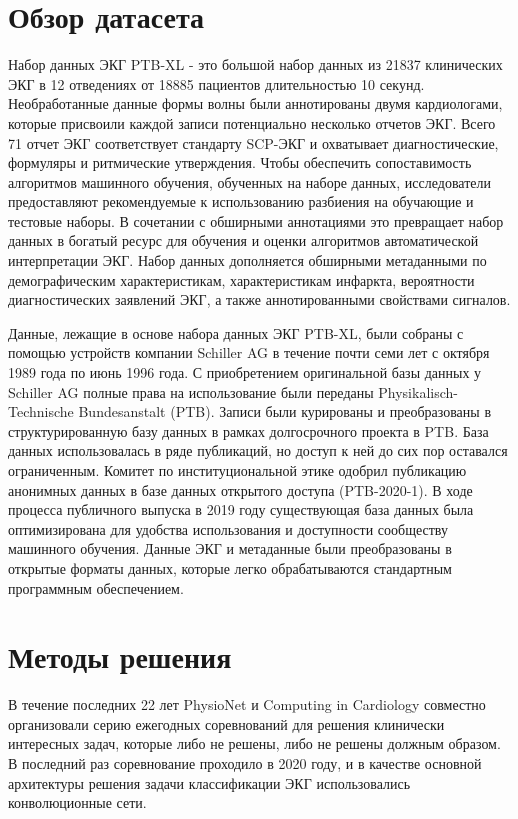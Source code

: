 \documentclass[oneside,final,14pt]{extreport}
\begin{document}
\section{Обзор датасета}
Набор данных ЭКГ PTB-XL\cite{bib:ptb-xl} - это большой набор данных из 21837 клинических ЭКГ в 12 отведениях от 18885 пациентов длительностью 10 секунд. Необработанные данные формы волны были аннотированы двумя кардиологами, которые присвоили каждой записи потенциально несколько отчетов ЭКГ. Всего 71 отчет ЭКГ соответствует стандарту SCP-ЭКГ и охватывает диагностические, формуляры и ритмические утверждения. Чтобы обеспечить сопоставимость алгоритмов машинного обучения, обученных на наборе данных, исследователи предоставляют рекомендуемые к использованию разбиения на обучающие и тестовые наборы. В сочетании с обширными аннотациями это превращает набор данных в богатый ресурс для обучения и оценки алгоритмов автоматической интерпретации ЭКГ. Набор данных дополняется обширными метаданными по демографическим характеристикам, характеристикам инфаркта, вероятности диагностических заявлений ЭКГ, а также аннотированными свойствами сигналов.

Данные, лежащие в основе набора данных ЭКГ PTB-XL, были собраны с помощью устройств компании Schiller AG в течение почти семи лет с октября 1989 года по июнь 1996 года. С приобретением оригинальной базы данных у Schiller AG полные права на использование были переданы Physikalisch-Technische Bundesanstalt (PTB). Записи были курированы и преобразованы в структурированную базу данных в рамках долгосрочного проекта в  PTB. База данных использовалась в ряде публикаций, но доступ к ней до сих пор оставался ограниченным. Комитет по институциональной этике одобрил публикацию анонимных данных в базе данных открытого доступа (PTB-2020-1). В ходе процесса публичного выпуска в 2019 году существующая база данных была оптимизирована для удобства использования и доступности сообществу машинного обучения. Данные ЭКГ и метаданные были преобразованы в открытые форматы данных, которые легко обрабатываются стандартным программным обеспечением.
\section{Методы решения}\label{sec:ecg_conv}
В течение последних 22 лет PhysioNet и Computing in Cardiology совместно организовали серию ежегодных соревнований для решения клинически интересных задач, которые либо не решены, либо не решены должным образом. В последний раз соревнование проходило в 2020 году, и в качестве основной архитектуры решения задачи классификации ЭКГ использовались конволюционные сети\cite{bib:competition}.
\end{document}
